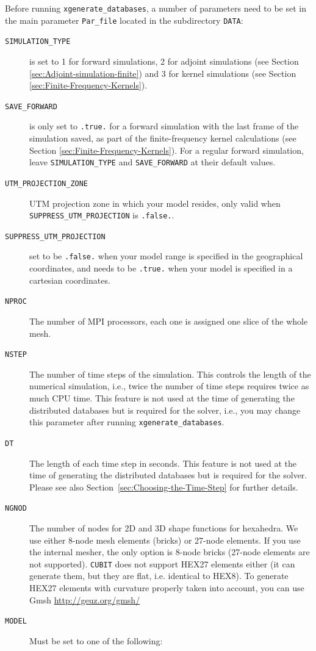 Before running \texttt{xgenerate\_databases}, a number of parameters
need to be set in the main parameter \texttt{Par\_file} located in
the subdirectory \texttt{DATA}:
\begin{description}
\item [{\texttt{SIMULATION\_TYPE}}] is set to 1 for forward simulations,
2 for adjoint simulations (see Section \ref{sec:Adjoint-simulation-finite})
and 3 for kernel simulations (see Section \ref{sec:Finite-Frequency-Kernels}).
\item [{\texttt{SAVE\_FORWARD}}] is only set to \texttt{.true.} for a forward
simulation with the last frame of the simulation saved, as part of
the finite-frequency kernel calculations (see Section \ref{sec:Finite-Frequency-Kernels}).
For a regular forward simulation, leave \texttt{SIMULATION\_TYPE}
and \texttt{SAVE\_FORWARD} at their default values.
\item [{\texttt{UTM\_PROJECTION\_ZONE}}] UTM projection zone in
which your model resides, only valid when \texttt{SUPPRESS\_UTM\_PROJECTION} is \texttt{.false.}.
\item [{\texttt{SUPPRESS\_UTM\_PROJECTION}}] set to be \texttt{.false.}
when your model range is specified in the geographical coordinates,
and needs to be \texttt{.true.} when your model is specified in a
cartesian coordinates. 
\item [{\texttt{NPROC}}] The number of MPI processors, each one is assigned
one slice of the whole mesh.
\item [{\texttt{NSTEP}}] The number of time steps of the simulation. This
controls the length of the numerical simulation, i.e., twice the number
of time steps requires twice as much CPU time. This feature is not
used at the time of generating the distributed databases but is required
for the solver, i.e., you may change this parameter after running
\texttt{xgenerate\_databases}.
\item [{\texttt{DT}}] The length of each time step in seconds. This feature
is not used at the time of generating the distributed databases but
is required for the solver. Please see also Section~\ref{sec:Choosing-the-Time-Step}
for further details.
\item [{\texttt{NGNOD}}] The number of nodes for 2D and 3D shape functions
for hexahedra. We use either 8-node mesh elements (bricks) or 27-node
elements. If you use the internal mesher, the only option is 8-node
bricks (27-node elements are not supported). \texttt{CUBIT} does not
support HEX27 elements either (it can generate them, but they are
flat, i.e. identical to HEX8). To generate HEX27 elements with curvature
properly taken into account, you can use Gmsh \url{http://geuz.org/gmsh/}
\item [{\texttt{MODEL}}] Must be set to one of the following:


\end{description}
